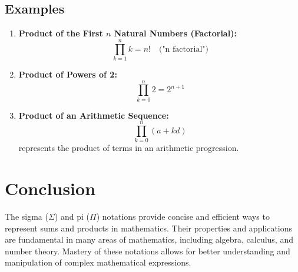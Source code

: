 \documentclass{article}
\begin{document}
\subsection{Examples}
\begin{enumerate}
    \item \textbf{Product of the First \(n\) Natural Numbers (Factorial):}
    \[
    \prod_{k=1}^{n} k = n! \quad \text{("n factorial")}
    \]
    
    \item \textbf{Product of Powers of 2:}
    \[
    \prod_{k=0}^{n} 2 = 2^{n+1}
    \]
    
    \item \textbf{Product of an Arithmetic Sequence:}
    \[
    \prod_{k=0}^{n} (a + kd)
    \]
    represents the product of terms in an arithmetic progression.
\end{enumerate}

\section*{Conclusion}
The sigma (\(\Sigma\)) and pi (\(\Pi\)) notations provide concise and efficient ways to represent sums and products in mathematics. Their properties and applications are fundamental in many areas of mathematics, including algebra, calculus, and number theory. Mastery of these notations allows for better understanding and manipulation of complex mathematical expressions.
\end{document}
